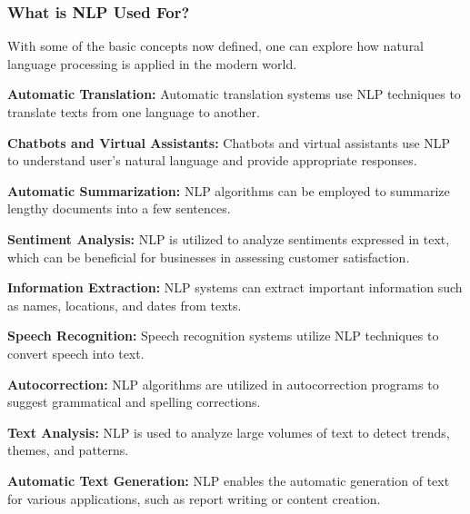 \subsubsection*{What is NLP Used For?}

With some of the basic concepts now defined, one can explore how natural language processing is applied in the modern world.

\textbf{Automatic Translation:} Automatic translation systems use NLP techniques to translate texts from one language to another.

\textbf{Chatbots and Virtual Assistants:} Chatbots and virtual assistants use NLP to understand user's natural language and provide appropriate responses.

\textbf{Automatic Summarization:} NLP algorithms can be employed to summarize lengthy documents into a few sentences.

\textbf{Sentiment Analysis:} NLP is utilized to analyze sentiments expressed in text, which can be beneficial for businesses in assessing customer satisfaction.

\textbf{Information Extraction:} NLP systems can extract important information such as names, locations, and dates from texts.

\textbf{Speech Recognition:} Speech recognition systems utilize NLP techniques to convert speech into text.

\textbf{Autocorrection:} NLP algorithms are utilized in autocorrection programs to suggest grammatical and spelling corrections.

\textbf{Text Analysis:} NLP is used to analyze large volumes of text to detect trends, themes, and patterns.

\textbf{Automatic Text Generation:} NLP enables the automatic generation of text for various applications, such as report writing or content creation.